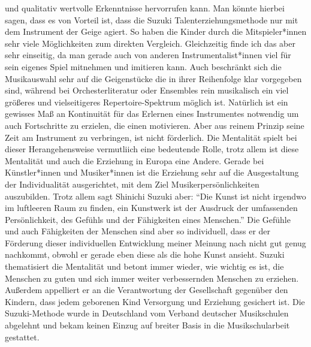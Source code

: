 und qualitativ wertvolle Erkenntnisse hervorrufen kann. Man könnte hierbei
sagen, dass es von Vorteil ist, dass die Suzuki Talenterziehungsmethode nur mit
dem Instrument der Geige agiert. So haben die Kinder durch die Mitspieler*innen
sehr viele Möglichkeiten zum direkten Vergleich. Gleichzeitig finde ich das aber
sehr einseitig, da man gerade auch von anderen Instrumentalist*innen viel für
sein eigenes Spiel mitnehmen und imitieren kann. Auch beschränkt sich die
Musikauswahl sehr auf die Geigenstücke die in ihrer Reihenfolge klar vorgegeben
sind, während bei Orchesterliteratur oder Ensembles rein musikalisch ein viel
größeres und vielseitigeres Repertoire-Spektrum möglich ist. Natürlich ist ein
gewisses Maß an Kontinuität für das Erlernen eines Instrumentes notwendig um
auch Fortschritte zu erzielen, die einen motivieren. Aber aus reinem Prinzip seine Zeit
am Instrument zu verbringen, ist nicht förderlich. Die Mentalität spielt
bei dieser Herangehensweise vermutliich eine bedeutende Rolle, trotz allem ist
diese Mentalität und auch die Erziehung in Europa eine Andere. Gerade bei
Künstler*innen und Musiker*innen ist die Erziehung sehr auf die Ausgestaltung
der Individualität ausgerichtet, mit dem Ziel Musikerpersönlichkeiten
auszubilden. Trotz allem sagt Shinichi Suzuki aber: \enquote{Die Kunst ist nicht
irgendwo im luftleeren Raum zu finden, ein Kunstwerk ist der Ausdruck der
umfassenden Persönlichkeit, des Gefühls und der Fähigkeiten eines Menschen.}
\autocite[103]{suzuki:erziehung_ist_liebe} Die Gefühle und auch Fähigkeiten der
Menschen sind aber so individuell, dass er der Förderung dieser individuellen
Entwicklung meiner Meinung nach nicht gut genug nachkommt, obwohl er gerade eben
diese als die hohe Kunst ansieht. Suzuki thematisiert die Mentalität und betont
immer wieder, wie wichtig es ist, die Menschen zu guten und sich immer weiter
verbessernden Menschen zu erziehen. Außerdem appelliert er an die Verantwortung
der Gesellschaft gegenüber den Kindern, dass jedem geborenen Kind Versorgung und
Erziehung gesichert ist. \autocite[130]{suzuki:erziehung_ist_liebe}
Die Suzuki-Methode wurde in Deutschland vom Verband deutscher Musikschulen
abgelehnt und bekam keinen Einzug auf breiter Basis in die Musikschularbeit gestattet.
\autocite[49]{ernst:die_zukunftsfaehige_musikschule}
